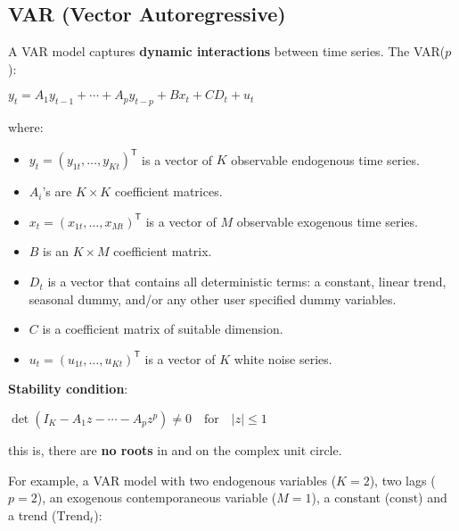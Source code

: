 \documentclass[10pt, a4paper, landscape]{article}
\newcommand{\tr}{\mathsf{T}}
\begin{document}
	\begin{multicols}{2}
		\section*{VAR (Vector Autoregressive)}
		
		A VAR model captures \textbf{dynamic interactions} between time series. The VAR($p$):
		
		\begin{center}
			$y_{t} = A_{1} y_{t - 1}+ \cdots + A_{p} y_{t - p} + B x_{t} + CD_{t} + u_{t}$
		\end{center}
		
		where:
		
		\begin{itemize}[leftmargin=*]
			\item $y_{t} = (y_{1t}, \ldots, y_{Kt})^{\tr}$ is a vector of $K$ observable endogenous time series.
			\item $A_{i}$'s are $K \times K$ coefficient matrices.
			\item $x_{t} = (x_{1t}, \ldots, x_{Mt})^{\tr}$ is a vector of $M$ observable exogenous time series.
			\item $B$ is an $K \times M$ coefficient matrix.
			\item $D_{t}$ is a vector that contains all deterministic terms: a constant, linear trend, seasonal dummy, and/or any other user specified dummy variables.
			\item $C$ is a coefficient matrix of suitable dimension.
			\item $u_{t} = (u_{1t}, \ldots, u_{Kt})^{\tr}$ is a vector of $K$ white noise series.
		\end{itemize}
		
		\textbf{Stability condition}:
		
		\begin{center}
			$\det(I_{K} - A_{1} z - \cdots - A_{p} z^{p}) \neq 0 \quad \mathrm{for}\quad \lvert z \rvert \leq 1$
		\end{center}
		
		\quad this is, there are \textbf{no roots} in and on the complex unit circle.
		
		For example, a VAR model with two endogenous variables ($K = 2$), two lags ($p = 2$), an exogenous contemporaneous variable ($M = 1$), a constant ($\mathrm{const}$) and a trend ($\mathrm{Trend}_{t}$):
		

\end{multicols}
\end{document}
